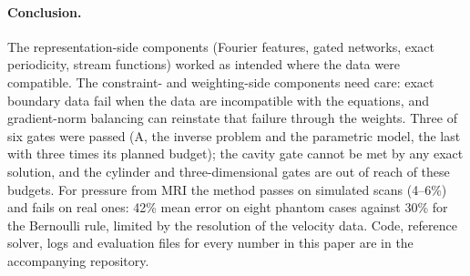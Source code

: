 \paragraph{Conclusion.} The representation-side components (Fourier features, gated networks, exact periodicity,
stream functions) worked as intended where the data were compatible. The constraint- and weighting-side components
need care: exact boundary data fail when the data are incompatible with the equations, and gradient-norm balancing
can reinstate that failure through the weights. Three of six gates were passed (A, the inverse problem and the
parametric model, the last with three times its planned budget); the cavity gate cannot be met by any exact
solution, and the cylinder and three-dimensional gates are out of reach of these budgets. For pressure from MRI the
method passes on simulated scans (4--6\%) and fails on real ones: 42\% mean error on eight phantom cases against 30\%
for the Bernoulli rule, limited by the resolution of the velocity data. Code, reference solver, logs and evaluation
files for every number in this paper are in the accompanying repository.
